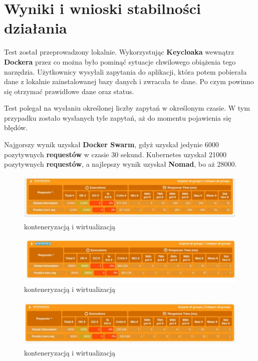 \documentclass{iiuwb}
\begin{document}
\section{Wyniki i wnioski stabilności działania}

Test został przeprowadzony lokalnie. Wykorzystując 
\textbf{Keycloaka} wewnątrz \textbf{Dockera} przez co 
można było pominąć sytuacje chwilowego obiążenia tego 
narzędzia. Użytkownicy wysyłali zapytania do aplikacji, 
która potem pobierała dane z lokalnie zainstalowanej 
bazy danych i zwracała te dane. Po czym powinno się 
otrzymać prawidłowe dane oraz status.

Test polegał na wysłaniu określonej liczby zapytań 
w określonym czasie. W tym przypadku zostało wysłanych 
tyle zapytań, aż do momentu pojawienia się błędów. 

Najgorszy wynik uzyskał \textbf{Docker Swarm}, gdyż 
uzyskał jedynie 6000 pozytywnych \textbf{requestów} 
w czasie 30 sekund. Kubernetes uzyskał 21000 pozytywnych 
\textbf{requestów}, a najlepszy wynik uzyskał \textbf{Nomad},
bo aż 28000.

\begin{figure}[!h]
\centering
\includegraphics[width=12cm]{kubernetes/ObciazenieKubernetes.pdf}
\caption{konteneryzacją i wirtualizacją}
\label{fig: Konteneryzacja i wirtualizacja}
\end{figure}

\begin{figure}[!h]
\centering
\includegraphics[width=12cm]{nomad/ObciazenieNomad.pdf}
\caption{konteneryzacją i wirtualizacją}
\label{fig: Konteneryzacja i wirtualizacja}
\end{figure}

\begin{figure}[!h]
\centering
\includegraphics[width=12cm]{swarm/ObiazenieDockerSwarm.pdf}
\caption{konteneryzacją i wirtualizacją}
\label{fig: Konteneryzacja i wirtualizacja}
\end{figure}
\end{document}
